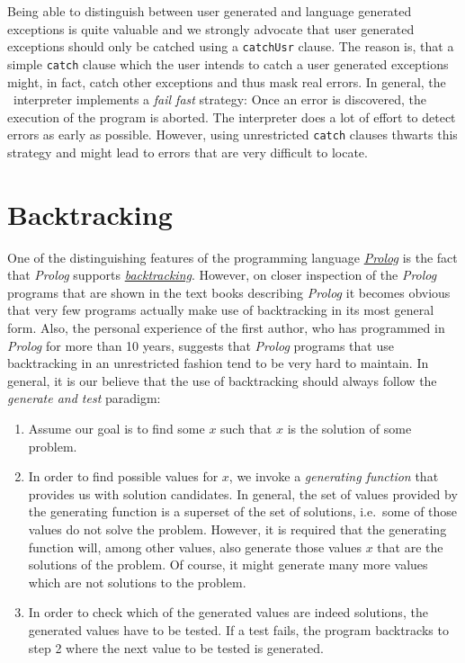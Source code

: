 Being able to distinguish between user generated  and language generated exceptions is
quite valuable and we strongly advocate that user generated exceptions should only be
catched using a \texttt{catchUsr} clause.  The reason is, that a simple
\texttt{catch} clause which the user intends to catch a user generated exceptions might,
in fact, catch 
other exceptions and thus mask real errors.  In general, the \setlx\ interpreter
implements a \emph{fail fast} strategy:  Once an error is discovered, the execution of the
program is aborted.  The interpreter does a lot of effort to detect errors as early as
possible.  However, using unrestricted \texttt{catch} clauses thwarts this strategy and
might lead to errors that are very difficult to locate.

\section{Backtracking}
One of the distinguishing features of the programming language 
\href{http://en.wikipedia.org/wiki/Prolog}{\textsl{Prolog}}
is the fact that \textsl{Prolog} supports 
\href{http://en.wikipedia.org/wiki/Backtracking}{\emph{backtracking}}.  
However, on closer inspection of the
\textsl{Prolog} programs that are shown in the text books describing \textsl{Prolog}
\cite{sterling86, bratko:90} it becomes obvious that very few programs actually make use of
backtracking in its most general form.  Also, the personal experience of the first author, who
has programmed in \textsl{Prolog} for more than 10 years, suggests that \textsl{Prolog}
programs that use backtracking in an unrestricted fashion tend to be very hard to maintain.  
In general, it is our believe that the use of backtracking should always follow the
\emph{generate and test} paradigm:
\begin{enumerate}
\item Assume our goal is to find some $x$ such that $x$ is the solution of some problem.
\item In order to find possible values for $x$, we invoke a \emph{generating function} that provides
      us with solution candidates.  In general, the set of values provided by the generating
      function is a superset of the set of solutions, i.e.~some of those values do not solve the
      problem.  However, it is required that the generating function will, among other values, also
      generate those values $x$ that are the solutions of the problem.  Of course, it might generate
      many more values which are not solutions to the problem. 
\item In order to check which of the generated values are indeed solutions, the generated values
      have to be tested.  If a test fails, the program backtracks to step 2 where the next value to
      be tested is generated. 
\end{enumerate}
